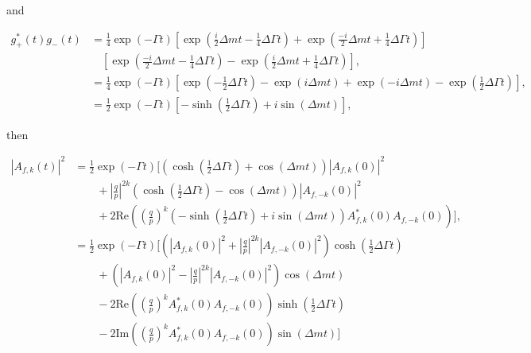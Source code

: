 \documentclass{report}
\def\Deltam{\ensuremath{\Delta m}\xspace}
\def\Deltagamma{\ensuremath{\Delta\Gamma}\xspace}
\def\half{\ensuremath{\frac{1}{2}}\xspace}
\newcommand\magsq[1]{\ensuremath{\left|#1\right|^2}\xspace}
\begin{document}
and

\begin{align}
  g_+^*(t)g_-(t) &= \frac{1}{4} \exp(-\Gamma t) \left[\exp\left(\frac{i}{2}\Deltam t - \frac{1}{4} \Deltagamma t\right) + \exp\left(\frac{-i}{2}\Deltam t + \frac{1}{4} \Deltagamma t\right)\right] \\
  & \quad \left[\exp\left(\frac{-i}{2}\Deltam t - \frac{1}{4} \Deltagamma t\right) - \exp\left(\frac{i}{2}\Deltam t + \frac{1}{4} \Deltagamma t\right)\right], \\
  &= \frac{1}{4} \exp(-\Gamma t) \left[\exp\left(-\half \Deltagamma t\right) - \exp\left(i\Deltam t\right) + \exp(-i\Deltam t) - \exp\left(\half\Deltagamma t\right)\right], \\
  &= \frac{1}{2} \exp(-\Gamma t)\left[-\sinh\left(\half \Deltagamma t\right) + i \sin(\Deltam t)\right],
\end{align}

then

\begin{align}
  \magsq{A_{f,k}(t)} &= \frac{1}{2} \exp(-\Gamma t)\Bigg[\left(\cosh\left(\half \Deltagamma t\right) + \cos(\Deltam t)\right) \magsq{A_{f,k}(0)} \\
    & \qquad + \left|\frac{q}{p}\right|^{2k} \left(\cosh\left(\half \Deltagamma t\right) - \cos(\Deltam t)\right) \magsq{A_{f,-k}(0)} \\
    & \qquad + 2 \mathrm{Re}\left(\left(\frac{q}{p}\right)^k \left(-\sinh\left(\half \Deltagamma t\right) + i \sin(\Deltam t)\right) A_{f,k}^*(0)A_{f,-k}(0)\right)\Bigg], \\
  &= \frac{1}{2} \exp(-\Gamma t)\Bigg[\left(\magsq{A_{f,k}(0)} + \left|\frac{q}{p}\right|^{2k} \magsq{A_{f,-k}(0)}\right) \cosh\left(\half \Deltagamma t\right) \\
    & \qquad + \left(\magsq{A_{f,k}(0)} - \left|\frac{q}{p}\right|^{2k} \magsq{A_{f,-k}(0)}\right) \cos(\Deltam t) \\
    & \qquad - 2 \mathrm{Re}\left(\left(\frac{q}{p}\right)^k A_{f,k}^*(0)A_{f,-k}(0) \right) \sinh\left(\half \Deltagamma t\right) \\
    & \qquad -2 \mathrm{Im}\left(\left(\frac{q}{p}\right)^k A_{f,k}^*(0)A_{f,-k}(0)\right) \sin(\Deltam t) \Bigg]
\end{align}
\end{document}
